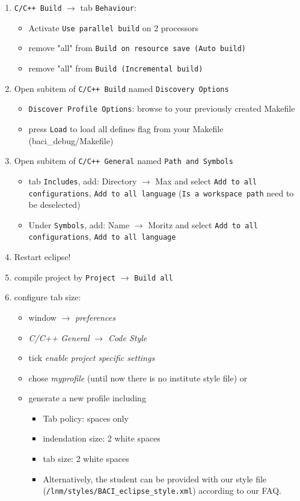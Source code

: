 \begin{enumerate}
\item \texttt{C/C++ Build} $ \rightarrow $ tab \texttt{Behaviour}:
\begin{itemize}
  \item Activate \texttt{Use parallel build} on 2 processors
  \item remove "all" from \texttt{Build on resource save (Auto build)}
  \item remove "all" from \texttt{Build (Incremental build)}
\end{itemize}

\item Open subitem of \texttt{C/C++ Build} named \texttt{Discovery Options}
\begin{itemize}
 \item \texttt{Discover Profile Options}: browse to your previously created Makefile
 \item press \texttt{Load} to load all defines flag from your Makefile
 (baci\_debug/Makefile)
\end{itemize}

\item Open subitem of \texttt{C/C++ General} named \texttt{Path and Symbols}
\begin{itemize}
  \item tab \texttt{Includes}, add: Directory $\rightarrow$ Max and select \texttt{Add to all configurations}, \texttt{Add to all language} (\texttt{Is a workspace path} need to be deselected)
  \item Under \texttt{Symbols}, add: Name $\rightarrow$ Moritz and select \texttt{Add to all configurations}, \texttt{Add to all language}
\end{itemize}

\item Restart eclipse!

\item compile project by \texttt{Project} $\rightarrow$ \texttt{Build all}

\item configure tab size:
\begin{itemize}
 \item window $\rightarrow$ {\it{preferences}}
 \item {\it{C/C++ General}} $\rightarrow$  {\it{Code Style}}
 \item tick {\it{enable project specific settings}}
 \item chose {\it{myprofile}} (until now there is no institute style file) or
 \item generate a new profile including 
  \begin{itemize}
    \item Tab policy: spaces only
    \item indendation size: 2 white spaces 
    \item tab size: 2 white spaces
    \item Alternatively, the student can be provided with our style file
    \newline (\texttt{/lnm/styles/BACI\_eclipse\_style.xml}) according to our
    FAQ.
  \end{itemize}
\end{itemize}


\end{enumerate}
